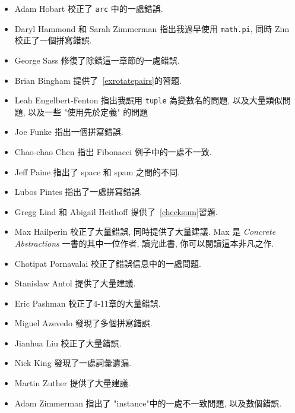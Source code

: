 \documentclass[10pt]{book}
\begin{document}
\begin{itemize}
\item Adam Hobart 校正了 {\tt arc} 中的一處錯誤. 

\item Daryl Hammond 和 Sarah Zimmerman 指出我過早使用 {\tt math.pi}, 
同時 Zim 校正了一個拼寫錯誤. 

\item George Sass 修復了除錯這一章節的一處錯誤. 

\item Brian Bingham 提供了~\ref{exrotatepairs}的習題. 

\item Leah Engelbert-Fenton 指出我誤用 {\tt tuple} 為變數名的問題, 
以及大量類似問題, 以及一些 "使用先於定義" 的問題

\item Joe Funke 指出一個拼寫錯誤. 

\item Chao-chao Chen 指出 Fibonacci 例子中的一處不一致. 

\item Jeff Paine 指出了 space 和 spam 之間的不同. 

\item Lubos Pintes 指出了一處拼寫錯誤. 

\item Gregg Lind 和 Abigail Heithoff 提供了~\ref{checksum}習題. 

\item Max Hailperin 校正了大量錯誤, 同時提供了大量建議. 
Max 是 {\em Concrete Abstractions} 一書的其中一位作者, 讀完此書, 
你可以閱讀這本非凡之作. 

\item Chotipat Pornavalai 校正了錯誤信息中的一處問題. 

\item Stanislaw Antol 提供了大量建議. 

\item Eric Pashman 校正了4-11章的大量錯誤. 

\item Miguel Azevedo 發現了多個拼寫錯誤. 

\item Jianhua Liu 校正了大量錯誤. 

\item Nick King 發現了一處詞彙遺漏. 

\item Martin Zuther 提供了大量建議. 

\item Adam Zimmerman 指出了 "instance"中的一處不一致問題, 以及數個錯誤. 


\end{itemize}
\end{document}
